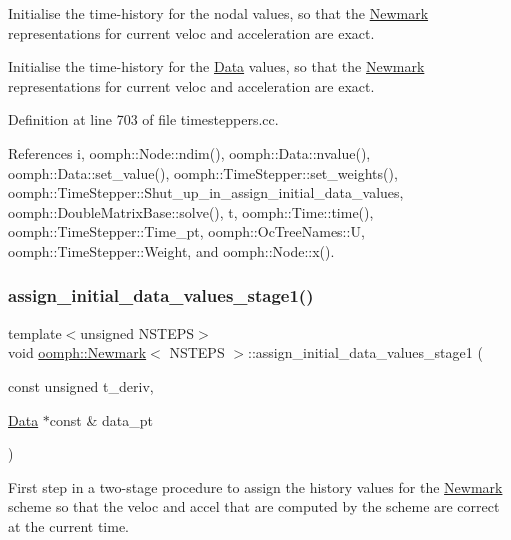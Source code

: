 Initialise the time-\/history for the nodal values, so that the \hyperlink{classoomph_1_1Newmark}{Newmark} representations for current veloc and acceleration are exact. 

Initialise the time-\/history for the \hyperlink{classoomph_1_1Data}{Data} values, so that the \hyperlink{classoomph_1_1Newmark}{Newmark} representations for current veloc and acceleration are exact. 

Definition at line 703 of file timesteppers.\+cc.



References i, oomph\+::\+Node\+::ndim(), oomph\+::\+Data\+::nvalue(), oomph\+::\+Data\+::set\+\_\+value(), oomph\+::\+Time\+Stepper\+::set\+\_\+weights(), oomph\+::\+Time\+Stepper\+::\+Shut\+\_\+up\+\_\+in\+\_\+assign\+\_\+initial\+\_\+data\+\_\+values, oomph\+::\+Double\+Matrix\+Base\+::solve(), t, oomph\+::\+Time\+::time(), oomph\+::\+Time\+Stepper\+::\+Time\+\_\+pt, oomph\+::\+Oc\+Tree\+Names\+::U, oomph\+::\+Time\+Stepper\+::\+Weight, and oomph\+::\+Node\+::x().

\mbox{\label{classoomph_1_1Newmark_a520bb445dfb9f4418058ab1d40bd57ea}} 
\subsubsection{\texorpdfstring{assign\+\_\+initial\+\_\+data\+\_\+values\+\_\+stage1()}{assign\_initial\_data\_values\_stage1()}}
{\footnotesize\ttfamily template$<$unsigned N\+S\+T\+E\+PS$>$ \\
void \hyperlink{classoomph_1_1Newmark}{oomph\+::\+Newmark}$<$ N\+S\+T\+E\+PS $>$\+::assign\+\_\+initial\+\_\+data\+\_\+values\+\_\+stage1 (\begin{DoxyParamCaption}\item[{const unsigned}]{t\+\_\+deriv,  }\item[{\hyperlink{classoomph_1_1Data}{Data} $\ast$const \&}]{data\+\_\+pt }\end{DoxyParamCaption})}



First step in a two-\/stage procedure to assign the history values for the \hyperlink{classoomph_1_1Newmark}{Newmark} scheme so that the veloc and accel that are computed by the scheme are correct at the current time. 

